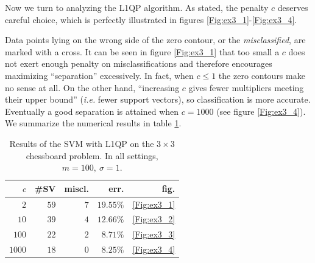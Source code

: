 \documentclass[11pt,a4paper]{article}
\theoremstyle{definition}
\begin{document}
      Now we turn to analyzing the L1QP algorithm. As stated, the penalty $c$ deserves careful choice, which is perfectly illustrated in figures \ref{Fig:ex3_1}-\ref{Fig:ex3_4}.

      Data points lying on the wrong side of the zero contour, or the \textit{misclassified}, are marked with a cross. It can be seen in figure \ref{Fig:ex3_1} that too small a $c$ does not exert enough penalty on misclassifications and therefore encourages maximizing ``separation'' excessively. In fact, when $c\leq 1$ the zero contours make no sense at all. On the other hand, ``increasing $c$ gives fewer multipliers meeting their upper bound'' \cite{fletcher2010binary} (\textit{i.e.} fewer support vectors), so classification is more accurate. Eventually a good separation is attained when $c=1000$ (see figure \ref{Fig:ex3_4}). We summarize the numerical results in table \ref{Tab:ex3}.
        \begin{savenotes}\begin{table}[htbp]
          \centering
            \begin{tabular}{r|rrr|r}
            \toprule
            $c$    & \#SV    & miscl.  & err.      & fig. \\
            \midrule
            $2$    & $59$    & $7$     & $19.55\%$ & \ref{Fig:ex3_1} \\
            $10$   & $39$    & $4$     & $12.66\%$ & \ref{Fig:ex3_2} \\
            $100$  & $22$    & $2$     & $8.71\%$  & \ref{Fig:ex3_3} \\
            $1000$ & $18$    & $0$     & $8.25\%$  & \ref{Fig:ex3_4} \\
            \bottomrule
            \end{tabular}%
          \caption{Results of the SVM with L1QP on the $3\times 3$ chessboard problem. In all settings, $m=100,~\sigma=1$.}
          \label{Tab:ex3}%
        \end{table}\end{savenotes}%
\end{document}
